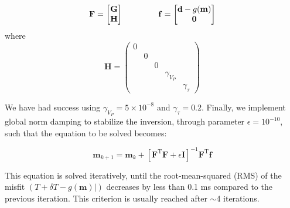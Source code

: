 \begin{equation}
	\mathbf{F} = 
	\left[\begin{matrix}
	\mathbf{G}\\\mathbf{H}
	\end{matrix}\right] 
	\hspace{15mm}
	\mathbf{f} = 
	\left[\begin{matrix}
	\mathbf{d} - g(\mathbf{m})\\\mathbf{0}
	\end{matrix}\right] 
\end{equation}
where
\begin{equation}
	\mathbf{H} = 
	\left(\begin{matrix}
	0 &&&&\\ &0&&&\\ &&0&&\\ &&&\gamma_{V_P}&\\ &&&& \gamma_{\tau}
	\end{matrix}\right) 
\end{equation}

We have had success using $\gamma_{V_P} = 5\times10^{-8}$ and $\gamma_{\tau} = 0.2$.  Finally, we implement global norm damping to stabilize the inversion, through parameter $\epsilon = 10^{-10}$, such that the equation to be solved becomes:

\begin{equation}
	\mathbf{m}_{k+1} = \mathbf{m}_k + \left[ \mathbf{F}^{\text{T}} \mathbf{F} + \epsilon\mathbf{I} \right]^{-1} \mathbf{F}^{\text{T}} \mathbf{f} \label{eq:inverse}
\end{equation}

This equation is solved iteratively, until the root-mean-squared (RMS) of the misfit $(T+\delta T-g(\mathbf{m})|)$ decreases by less than 0.1 ms compared to the previous iteration. This criterion is usually reached after $\sim$4 iterations. 

